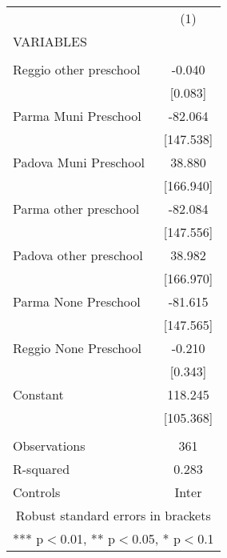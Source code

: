 \begin{tabular}{lc} \hline
 & (1) \\
VARIABLES &  \\ \hline
 &  \\
Reggio other preschool & -0.040 \\
 & [0.083] \\
Parma Muni Preschool & -82.064 \\
 & [147.538] \\
Padova Muni Preschool & 38.880 \\
 & [166.940] \\
Parma other preschool & -82.084 \\
 & [147.556] \\
Padova other preschool & 38.982 \\
 & [166.970] \\
Parma None Preschool & -81.615 \\
 & [147.565] \\
Reggio None Preschool & -0.210 \\
 & [0.343] \\
Constant & 118.245 \\
 & [105.368] \\
 &  \\
Observations & 361 \\
R-squared & 0.283 \\
 Controls & Inter \\ \hline
\multicolumn{2}{c}{ Robust standard errors in brackets} \\
\multicolumn{2}{c}{ *** p$<$0.01, ** p$<$0.05, * p$<$0.1} \\
\end{tabular}
